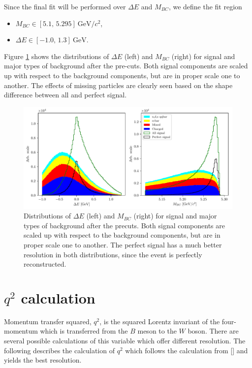 \documentclass[  headings=standardclasses,
  headings=big,oneside,a4paper,openany,12pt]{scrbook}
\newcommand {\e}[1]{\mathrm{~#1}}
\begin{document}
Since the final fit will be performed over $\Delta E$ and $M_{BC}$, we define the fit region
\begin{itemize}
\item $M_{BC} \in [5.1,\,5.295]\e{GeV}/c^2$,
\item $\Delta E \in [-1.0,\,1.3]\e{GeV}$.
\end{itemize}

Figure \ref{fig:mbc_de_pre} shows the distributions of $\Delta E$ (left) and $M_{BC}$ (right) for signal and major types of background after the pre-cuts. Both signal components are scaled up with respect to the background components, but are in proper scale one to another. The effects of missing particles are clearly seen based on the shape difference between all and perfect signal.

\begin{figure}[H]
\centering
\captionsetup{width=0.8\linewidth}
\includegraphics[width=\linewidth]{fig/mbc_de_pre}
\caption{Distributions of $\Delta E$ (left) and $M_{BC}$ (right) for signal and major types of background after the precuts. Both signal components are scaled up with respect to the background components, but are in proper scale one to another. The perfect signal has a much better resolution in both distributions, since the event is perfectly reconstructed.}
\label{fig:mbc_de_pre}
\end{figure}


\section{$q^2$ calculation}

Momentum transfer squared, $q^2$, is the squared Lorentz invariant of the four-momentum which is transferred from the $B$ meson to the $W$ boson. There are several possible calculations of this variable which offer different resolution. The following describes the calculation of $q^2$ which follows the calculation from [] and yields the best resolution.
\end{document}
